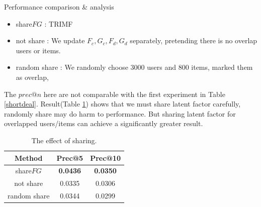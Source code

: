 \begin{section}{Performance comparison \& analysis}
    \begin{itemize}
    \item share$FG$ : TRIMF
    \item not share : We update $F_c, G_c, F_d, G_d$ separately, pretending there is no overlap users or items.
    \item random share : We randomly choose 3000 users and 800 items, marked them as overlap,
    \end{itemize}
    The $prec@n$ here are not comparable with the first experiment in Table \ref{shortdeal}. Result(Table \ref{sharing}) shows that we must share latent factor carefully, randomly share may do harm to performance. But sharing latent factor for overlapped users/items can achieve a significantly greater result.

    \par{
\begin{table}
\begin{center}
  \begin{tabular}{|c|c|c|}
    \hline
    Method&Prec@5&Prec@10\\
    \hline
    share$FG$&\textbf{\color{red}0.0436}&\textbf{\color{red}0.0350}\\
    \hline
    not share&0.0335&0.0306\\
    \hline
    random share&0.0344&0.0299\\
    \hline
  \end{tabular}
\end{center}
\caption{The effect of sharing.}
\label{sharing}
\end{table}
}
\end{section}

